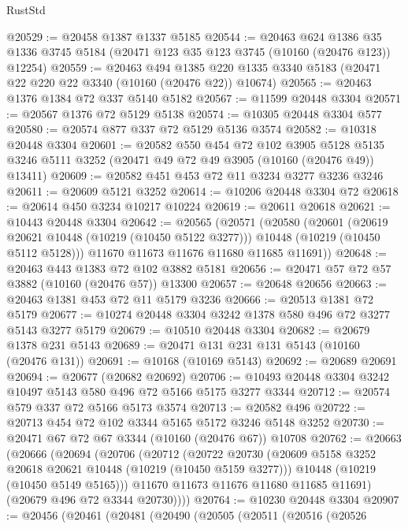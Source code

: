 \begin{lexlean}{RustStd}
\begin{coremodule}
@20529 := @20458 @1387 @1337 @5185
@20544 := @20463
    @624
    @1386
    @35
    @1336
    @3745
    @5184
    (@20471 @123 @35 @123 @3745 (@10160 (@20476 @123)) @12254)
@20559 := @20463
    @494
    @1385
    @220
    @1335
    @3340
    @5183
    (@20471 @22 @220 @22 @3340 (@10160 (@20476 @22)) @10674)
@20565 := @20463 @1376 @1384 @72 @337 @5140 @5182
@20567 := @11599 @20448 @3304
@20571 := @20567 @1376 @72 @5129 @5138
@20574 := @10305 @20448 @3304 @577
@20580 := @20574 @877 @337 @72 @5129 @5136 @3574
@20582 := @10318 @20448 @3304
@20601 := @20582
    @550
    @454
    @72
    @102
    @3905
    @5128
    @5135
    @3246
    @5111
    @3252
    (@20471 @49 @72 @49 @3905 (@10160 (@20476 @49)) @13411)
@20609 := @20582 @451 @453 @72 @11 @3234 @3277 @3236 @3246
@20611 := @20609 @5121 @3252
@20614 := @10206 @20448 @3304 @72
@20618 := @20614 @450 @3234 @10217 @10224
@20619 := @20611 @20618
@20621 := @10443 @20448 @3304
@20642 := @20565
    (@20571
      (@20580
        (@20601
          (@20619 @20621 @10448 (@10219 (@10450 @5122 @3277)))
          @10448
          (@10219 (@10450 @5112 @5128)))
        @11670
        @11673
        @11676
        @11680
        @11685
        @11691))
@20648 := @20463 @443 @1383 @72 @102 @3882 @5181
@20656 := @20471 @57 @72 @57 @3882 (@10160 (@20476 @57)) @13300
@20657 := @20648 @20656
@20663 := @20463 @1381 @453 @72 @11 @5179 @3236
@20666 := @20513 @1381 @72 @5179
@20677 := @10274 @20448 @3304 @3242 @1378 @580 @496 @72 @3277 @5143 @3277 @5179
@20679 := @10510 @20448 @3304
@20682 := @20679 @1378 @231 @5143
@20689 := @20471 @131 @231 @131 @5143 (@10160 (@20476 @131))
@20691 := @10168 (@10169 @5143)
@20692 := @20689 @20691
@20694 := @20677 (@20682 @20692)
@20706 := @10493 @20448 @3304 @3242 @10497 @5143 @580 @496 @72 @5166 @5175 @3277 @3344
@20712 := @20574 @579 @337 @72 @5166 @5173 @3574
@20713 := @20582 @496
@20722 := @20713 @454 @72 @102 @3344 @5165 @5172 @3246 @5148 @3252
@20730 := @20471 @67 @72 @67 @3344 (@10160 (@20476 @67)) @10708
@20762 := @20663
    (@20666
      (@20694
        (@20706
          (@20712
            (@20722
              @20730
              (@20609 @5158 @3252 @20618 @20621 @10448 (@10219 (@10450 @5159 @3277)))
              @10448
              (@10219 (@10450 @5149 @5165)))
            @11670
            @11673
            @11676
            @11680
            @11685
            @11691)
          (@20679 @496 @72 @3344 @20730))))
@20764 := @10230 @20448 @3304
@20907 := @20456
    (@20461
      (@20481
        (@20490
          (@20505
            (@20511
              (@20516
                (@20526

\end{coremodule}
\end{lexlean}
